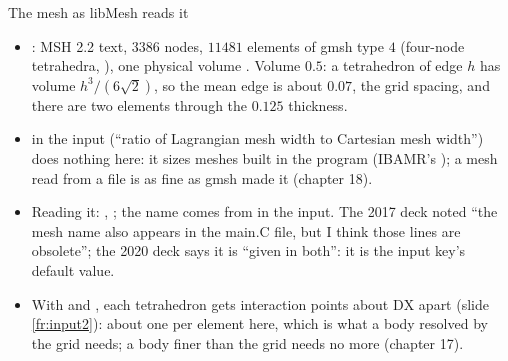\documentclass[aspectratio=169,11pt]{beamer}
\begin{document}
\begin{frame}{The mesh as libMesh reads it}
\label{fr:mesh}
\footnotesize
\begin{itemize}
  \item {}: MSH 2.2 text, $3386$ nodes, $11481$ elements of gmsh type $4$ (four-node tetrahedra, ), one physical volume . Volume $0.5$: a tetrahedron of edge $h$ has volume $h^3/(6\sqrt2)$, so the mean edge is about $0.07$, the grid spacing, and there are two elements through the $0.125$ thickness.
  \item {} in the input (``ratio of Lagrangian mesh width to Cartesian mesh width'') does nothing here: it sizes meshes built in the program (IBAMR's ); a mesh read from a file is as fine as gmsh made it (chapter 18).
  \item Reading it: , ; the name comes from  in the input. The 2017 deck noted ``the mesh name also appears in the main.C file, but I think those lines are obsolete''; the 2020 deck says it is ``given in both'': it is the input key's default value.
  \item With  and , each tetrahedron gets interaction points about $\mathrm{DX}$ apart (slide \ref{fr:input2}): about one per element here, which is what a body resolved by the grid needs; a body finer than the grid needs no more (chapter 17).
\end{itemize}
\end{frame}
\end{document}
